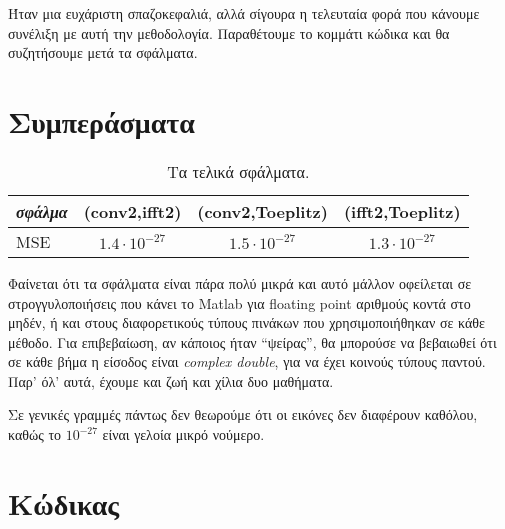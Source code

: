 \documentclass[11pt]{scrartcl} %
\begin{document}
Ήταν μια ευχάριστη σπαζοκεφαλιά, αλλά σίγουρα η τελευταία φορά που κάνουμε συνέλιξη με αυτή την μεθοδολογία.
Παραθέτουμε το κομμάτι κώδικα και θα συζητήσουμε μετά τα σφάλματα.


\section{Συμπεράσματα}

\begin{table}[h] %
    \centering %
    \begin{tabular}{l c c c}
        \toprule
        \textit{σφάλμα} & \textbf{(conv2,ifft2)} & \textbf{(conv2,Toeplitz)} & \textbf{(ifft2,Toeplitz)} \\
        \midrule
        \midrule
        MSE & $1.4\cdot 10^{-27}$ & $1.5\cdot 10^{-27}$ & $1.3\cdot 10^{-27}$ \\
        \bottomrule
    \end{tabular}
    \caption{Τα τελικά σφάλματα.}
\end{table}

Φαίνεται ότι τα σφάλματα είναι πάρα πολύ μικρά και αυτό μάλλον οφείλεται σε στρογγυλοποιήσεις που κάνει
το Matlab για floating point αριθμούς κοντά στο μηδέν, ή και στους διαφορετικούς τύπους πινάκων που χρησιμοποιήθηκαν
σε κάθε μέθοδο. Για επιβεβαίωση, αν κάποιος ήταν ``ψείρας'', θα μπορούσε να βεβαιωθεί ότι σε κάθε βήμα η είσοδος
είναι \textit{complex double}, για να έχει κοινούς τύπους παντού. Παρ' όλ' αυτά, έχουμε και ζωή και χίλια δυο μαθήματα.

Σε γενικές γραμμές πάντως δεν θεωρούμε ότι οι εικόνες δεν διαφέρουν καθόλου, καθώς το $10^{-27}$ είναι γελοία μικρό νούμερο.

\section{Κώδικας}

\end{document}
